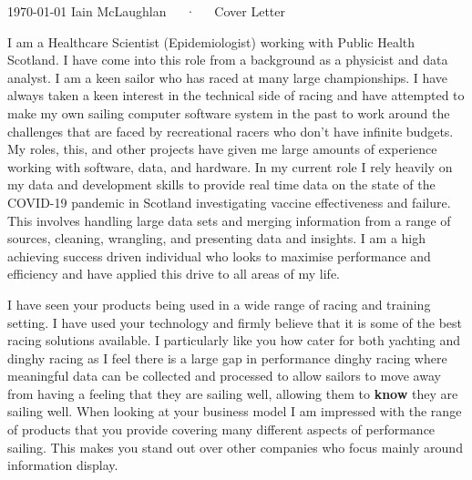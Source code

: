 \documentclass[11pt, a4paper]{awesome-cv}
\begin{document}
\makecvheader[R]

\makecvfooter
  {\today}
  {Iain McLaughlan~~~·~~~Cover Letter}
  {}

\makelettertitle

\begin{cvletter}

I am a Healthcare Scientist (Epidemiologist) working with Public Health Scotland. I have come into this role from a background as a physicist and data analyst. I am a keen sailor who has raced at many large championships. I have always taken a keen interest in the technical side of racing and have attempted to make my own sailing computer software system in the past to work around the challenges that are faced by recreational racers who don't have infinite budgets. My roles, this, and other projects have given me large amounts of experience working with software, data, and hardware. In my current role I rely heavily on my data and development skills to provide real time data on the state of the COVID-19 pandemic in Scotland investigating vaccine effectiveness and failure. This involves handling large data sets and merging information from a range of sources, cleaning, wrangling, and presenting data and insights. I am a high achieving success driven individual who looks to maximise performance and efficiency and have applied this drive to all areas of my life.


I have seen your products being used in a wide range of racing and training setting. I have used your technology and firmly believe that it is some of the best racing solutions available. I particularly like you how cater for both yachting and dinghy racing as I feel there is a large gap in performance dinghy racing where meaningful data can be collected and processed to allow sailors to move away from having a feeling that they are sailing well, allowing them to \textbf{know} they are sailing well. When looking at your business model I am impressed with the range of products that you provide covering many different aspects of performance sailing. This makes you stand out over other companies who focus mainly around information display.


\end{cvletter}
\end{document}
